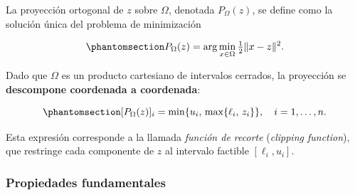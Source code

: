 \documentclass[
  spanish,
  us-letterpaper,
]{scrreprt}
\numberwithin{equation}{section}
\begin{document}
La proyección ortogonal de \(z\) sobre \(\Omega\), denotada
\(P_\Omega(z)\), se define como la solución única del problema de
minimización

\begin{equation}\phantomsection\label{eq-18}{
P_\Omega(z) = \arg\min_{x \in \Omega} \tfrac{1}{2}\|x - z\|^2. 
}\end{equation}

Dado que \(\Omega\) es un producto cartesiano de intervalos cerrados, la
proyección se \textbf{descompone coordenada a coordenada}:

\begin{equation}\phantomsection\label{eq-19}{
[P_\Omega(z)]_i = \min\{u_i,\, \max\{\ell_i,\, z_i\}\}, \quad i = 1,\dots,n. 
}\end{equation}

Esta expresión corresponde a la llamada \emph{función de recorte}
(\emph{clipping function}), que restringe cada componente de \(z\) al
intervalo factible \([\ell_i,u_i]\).

\subsubsection{Propiedades
fundamentales}\label{propiedades-fundamentales}
\end{document}
